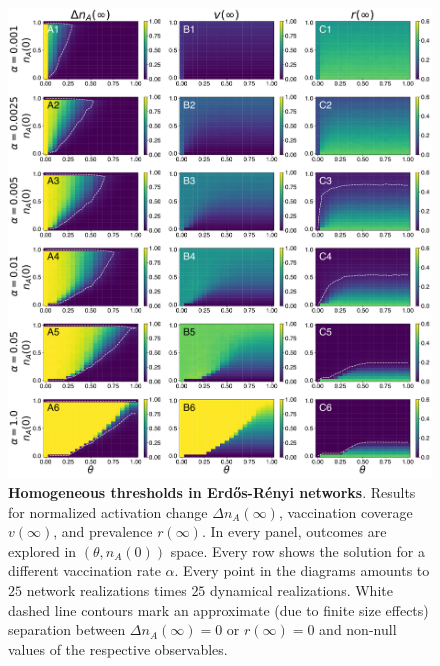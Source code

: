 \documentclass[
 reprint,
 amsmath,amssymb,
 aps,
]{revtex4-2}
\begin{document}
\begin{figure}[!ht]
\centering
\includegraphics[width=1.0\linewidth]{figure9.pdf}
\caption[Homogeneous thresholds in Erd\H{o}s-Rényi networks]{\textbf{Homogeneous thresholds in Erd\H{o}s-Rényi networks}. Results for normalized activation change $\Delta n_A(\infty)$, vaccination coverage $v(\infty)$, and prevalence $r(\infty)$. In every panel, outcomes are explored in $(\theta,n_A(0))$ space. Every row shows the solution for a different vaccination rate $\alpha$. Every point in the diagrams amounts to $25$ network realizations times $25$ dynamical realizations. White dashed line contours mark an approximate (due to finite size effects) separation between $\Delta n_A(\infty)=0$ or $r(\infty)=0$ and non-null values of the respective observables.}
\label{fig:supp_homo_er}
\end{figure}
\end{document}
